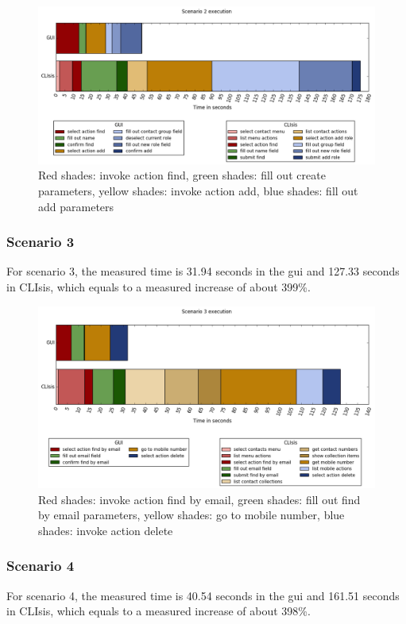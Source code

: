 \begin{figure}[H]
	\center
	\includegraphics[width=\textwidth]{figures/scenario2}
	\caption{Red shades: invoke action find, green shades: fill out create parameters, yellow shades: invoke action add, blue shades: fill out add parameters}
	\label{figure:scenario2timetrial}
\end{figure}

\subsubsection{Scenario 3}
For scenario 3, the measured time is 31.94 seconds in the \acrshort{gui} and 127.33 seconds in CLIsis, which equals to a measured increase of about 399\%.

\begin{figure}[H]
	\center
	\includegraphics[width=\textwidth]{figures/scenario3}
	\caption{Red shades: invoke action find by email, green shades: fill out find by email parameters, yellow shades: go to mobile number, blue shades: invoke action delete}
	\label{figure:scenario3timetrial}
\end{figure}

\subsubsection{Scenario 4}
For scenario 4, the measured time is 40.54 seconds in the \acrshort{gui} and 161.51 seconds in CLIsis, which equals to a measured increase of about 398\%.

